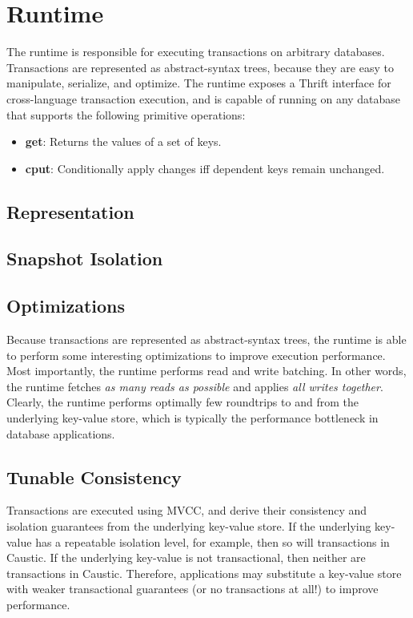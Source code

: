 \documentclass[12pt]{article}
\begin{document}
\section{Runtime}
The runtime is responsible for executing transactions on arbitrary databases. Transactions are represented as abstract-syntax trees, because they are easy to manipulate, serialize, and optimize. The runtime exposes a Thrift interface for cross-language transaction execution, and is capable of running on any database that supports the following primitive operations:

\begin{itemize}
  \item \textbf{get}: Returns the values of a set of keys.
  \item \textbf{cput}: Conditionally apply changes iff dependent keys remain unchanged.
\end{itemize}

\subsection{Representation}

\subsection{Snapshot Isolation}

\subsection{Optimizations}
Because transactions are represented as abstract-syntax trees, the runtime is able to perform some interesting optimizations to improve execution performance. Most importantly, the runtime performs read and write batching. In other words, the runtime fetches \emph{as many reads as possible} and applies \emph{all writes together}. Clearly, the runtime performs optimally few roundtrips to and from the underlying key-value store, which is typically the performance bottleneck in database applications. 

\subsection{Tunable Consistency}
Transactions are executed using MVCC, and derive their consistency and isolation guarantees from the underlying key-value store. If the underlying key-value has a repeatable isolation level, for example, then so will transactions in Caustic. If the underlying key-value is not transactional, then neither are transactions in Caustic. Therefore, applications may substitute a key-value store with weaker transactional guarantees (or no transactions at all!) to improve performance.
\end{document}
